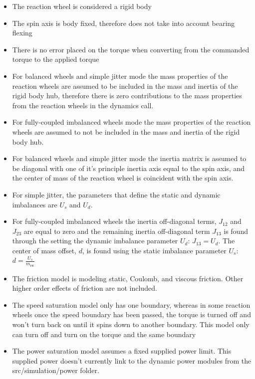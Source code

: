 \begin{itemize}
	\item The reaction wheel is considered a rigid body
	\item The spin axis is body fixed, therefore does not take into account bearing flexing
	\item There is no error placed on the torque when converting from the commanded torque to the applied torque
	\item For balanced wheels and simple jitter mode the mass properties of the reaction wheels are assumed to be included in the mass and inertia of the rigid body hub, therefore there is zero contributions to the mass properties from the reaction wheels in the dynamics call.
	\item For fully-coupled imbalanced wheels mode the mass properties of the reaction wheels are assumed to not be included in the mass and inertia of the rigid body hub.
	\item For balanced wheels and simple jitter mode the inertia matrix is assumed to be diagonal with one of it's principle inertia axis equal to the spin axis, and the center of mass of the reaction wheel is coincident with the spin axis.
	\item For simple jitter, the parameters that define the static and dynamic imbalances are $U_s$ and $U_d$.
	\item For fully-coupled imbalanced wheels the inertia off-diagonal terms, $J_{12}$ and $J_{23}$ are equal to zero and the remaining inertia off-diagonal term $J_{13}$ is found through the setting the dynamic imbalance parameter $U_d$: $J_{13} = U_d$. The center of mass offset, $d$, is found using the static imbalance parameter $U_s$: $d = \frac{U_s}{m_{\text{rw}}}$
	\item The friction model is modeling static, Coulomb, and viscous friction. Other higher order effects of friction are not included.
	\item The speed saturation model only has one boundary, whereas in some reaction wheels once the speed boundary has been passed, the torque is turned off and won't turn back on until it spins down to another boundary. This model only can turn off and turn on the torque and the same boundary
	\item The power saturation model assumes a fixed supplied power limit. This supplied power doesn't currently link to the dynamic power modules from the src/simulation/power folder.
\end{itemize}
